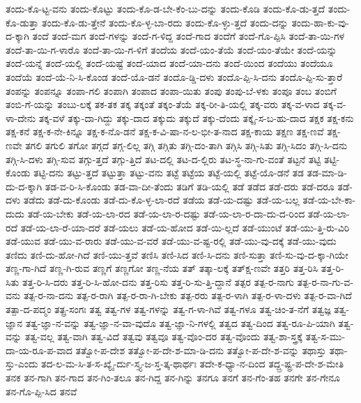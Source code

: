{ತಂದು-ಕೊ-ಟ್ಟ-ವನು
ತಂದು-ಕೊಟ್ಟು
ತಂದು-ಕೊ-ಡ-ಬೇ-ಕೆಂ-ಬು-ದನ್ನು
ತಂದು-ಕೊಡಿ
ತಂದು-ಕೊ-ಡು-ತ್ತದೆ
ತಂದು-ಕೊ-ಡುತ್ತಾ
ತಂದು-ಕೊ-ಡು-ತ್ತೇನೆ
ತಂದು-ಕೊ-ಳ್ಳ-ಬಾ-ರದು
ತಂದು-ಕೊ-ಳ್ಳು-ತ್ತದೆ
ತಂದು-ದನ್ನು
ತಂದು-ಹಾ-ಕು-ವು-ದ-ಕ್ಕಾಗಿ
ತಂದೆ
ತಂದೆ-ಮಗ
ತಂದೆ-ಗಳನ್ನು
ತಂದೆ-ಗ-ಳಿದ್ದ
ತಂದೆ-ಗಾದ
ತಂದೆಗೆ
ತಂದೆ-ಗೊ-ಪ್ಪಿಸಿ
ತಂದೆ-ತಾ-ಯಿ-ಗಳ
ತಂದೆ-ತಾ-ಯಿ-ಗ-ಳಾರೊ
ತಂದೆ-ತಾ-ಯಿ-ಗ-ಳಿಗೆ
ತಂದೆಯ
ತಂದೆ-ಯಂ-ತೆಯೆ
ತಂದೆ-ಯಂ-ತೆಯೇ
ತಂದೆ-ಯನ್ನು
ತಂದೆ-ಯನ್ನೆ
ತಂದೆ-ಯಲ್ಲಿ
ತಂದೆ-ಯಷ್ಟೆ
ತಂದೆ-ಯಾದ
ತಂದೆ-ಯಾ-ದನು
ತಂದೆ-ಯಿಂದ
ತಂದೆಯು
ತಂದೆಯೂ
ತಂದೆಯೆ
ತಂದೆ-ಯೆ-ನಿ-ಸಿ-ಕೊಂಡ
ತಂದೆ-ಯೊ-ಡನೆ
ತಂದೊ-ಡ್ಡಿ-ದಳು
ತಂದೊ-ಪ್ಪಿ-ಸಿ-ದನು
ತಂದೊ-ಪ್ಪಿ-ಸು-ತ್ತಾರೆ
ತಂಪನ್ನು
ತಂಪನ್ನೂ
ತಂಪಾ-ಗಲಿ
ತಂಪಾಗಿ
ತಂಪಾದ
ತಂಪಾ-ಯಿತು
ತಂಪು
ತಂಪು-ಬೆ-ಳಕು
ತಂಪೂ
ತಂಬ
ತಂಬಿಗೆ
ತಂಬಿ-ಗೆ-ಯನ್ನು
ತಂಬು-ಲಕ್ಕೆ
ತಕ-ತಕ
ತಕ್ಕ
ತಕ್ಕಂತೆ
ತಕ್ಕಂ-ತೆಯೆ
ತಕ್ಕ-ರೀ-ತಿ-ಯಲ್ಲಿ
ತಕ್ಕ-ವರು
ತಕ್ಕ-ವ-ಳಾದ
ತಕ್ಕ-ವ-ಳಾ-ದೇನು
ತಕ್ಕ-ವಳೆ
ತಕ್ಕು-ದಾ-ಗಿದ್ದು
ತಕ್ಕು-ದಾದ
ತಕ್ಕುದು
ತಕ್ಕುದೆ
ತಕ್ಕು-ದೆಂದು
ತಕ್ಕೈ-ಸ-ಬ-ಹು-ದಾದ
ತಕ್ಷಕ
ತಕ್ಷ-ಕನು
ತಕ್ಷ-ಕನೆ
ತಕ್ಷ-ಕ-ನೇ-ಕಿನ್ನೂ
ತಕ್ಷ-ಕ-ನೊ-ಡನೆ
ತಕ್ಷ-ಕ-ವಿ-ಷಾ-ನ-ಲ-ಭೀ-ತ-ನಾದ
ತಕ್ಷ-ಕಾಯ
ತಕ್ಷಣ
ತಕ್ಷ-ಣವೆ
ತಕ್ಷ-ಣವೇ
ತಗಲಿ
ತಗುಲಿ
ತಗೋ
ತಗ್ಗದೆ
ತಗ್ಗ-ಲಿಲ್ಲ
ತಗ್ಗಿ
ತಗ್ಗಿತು
ತಗ್ಗಿ-ದಂ-ತಾಗಿ
ತಗ್ಗಿಸಿ
ತಗ್ಗಿ-ಸಿತು
ತಗ್ಗಿ-ಸಿದಂ
ತಗ್ಗಿ-ಸಿ-ದನು
ತಗ್ಗಿ-ಸಿ-ದಳು
ತಗ್ಗಿ-ಸುವ
ತಗ್ಗು-ತ್ತದೆ
ತಗ್ಗು-ತ್ತಿದೆ
ತಟ-ದಲ್ಲಿ
ತಟ-ದ-ಲ್ಲಿರು
ತಟ-ಸ್ಥ-ನಾ-ಗು-ವಂತೆ
ತಟ್ಟನೆ
ತಟ್ಟಿ
ತಟ್ಟಿ-ಕೊಂಡು
ತಟ್ಟಿ-ದನು
ತಟ್ಟು-ತ್ತದೆ
ತಟ್ಟುತ್ತಾ
ತಟ್ಟು-ವನು
ತಟ್ಟೆ
ತಟ್ಟೆಯ
ತಟ್ಟೆ-ಯಲ್ಲಿ
ತಟ್ಟೆ-ಯೊ-ಡನೆ
ತಡ
ತಡ-ಮಾ-ಡಿ-ದು-ದ-ಕ್ಕಾಗಿ
ತಡ-ವ-ರಿ-ಸಿ-ಕೊಂಡು
ತಡ-ವಾ-ದೀ-ತೆಂದು
ತಡಿಗೆ
ತಡಿ-ಯಲ್ಲಿ
ತಡೆ
ತಡೆದ
ತಡೆ-ದರು
ತಡೆ-ದರೂ
ತಡೆ-ದಳು
ತಡೆದು
ತಡೆ-ದು-ಕೊಂಡು
ತಡೆ-ದು-ಕೊ-ಳ್ಳ-ಲಾ-ರದೆ
ತಡೆಯ
ತಡೆ-ಯ-ದಷ್ಟು
ತಡೆ-ಯ-ಬಲ್ಲ
ತಡೆ-ಯ-ಬೇ-ಕಾ-ದುದು
ತಡೆ-ಯ-ಬೇಕು
ತಡೆ-ಯ-ಲಾ-ರದ
ತಡೆ-ಯ-ಲಾ-ರ-ದಷ್ಟು
ತಡೆ-ಯ-ಲಾ-ರ-ದಾ-ದು-ದ-ರಿಂದ
ತಡೆ-ಯ-ಲಾ-ರದೆ
ತಡೆ-ಯ-ಲಾ-ರೆ-ಯಾ-ದರೆ
ತಡೆ-ಯಲು
ತಡೆ-ಯ-ಹೋದ
ತಡೆ-ಯಿ-ಲ್ಲದೆ
ತಡೆ-ಯುಂಟೆ
ತಡೆ-ಯು-ತ್ತಿ-ರು-ವಿರಿ
ತಡೆ-ಯುವ
ತಡೆ-ಯು-ವ-ರಾರು
ತಡೆ-ಯು-ವ-ವರೆ
ತಡೆ-ಯು-ವ-ಷ್ಟ-ರಲ್ಲಿ
ತಡೆ-ಯು-ವು-ದಕ್ಕೆ
ತಡೆ-ಯು-ವುದು
ತಣಿದು
ತಣಿ-ದು-ಹೋ-ಗಿದೆ
ತಣಿ-ಯು-ತ್ತವೆ
ತಣಿಸಿ
ತಣಿ-ಸಿದ
ತಣಿ-ಸಿ-ದನು
ತಣಿ-ಸುತ್ತಾ
ತಣಿ-ಸು-ವು-ದ-ಕ್ಕಾ-ಗಿಯೇ
ತಣ್ಣ-ಗಾ-ಗಿದೆ
ತಣ್ಣ-ಗಿ-ರುವ
ತಣ್ಣಗೆ
ತಣ್ಣಗೋ
ತಣ್ಣ-ನೆಯ
ತತ್
ತತ್ಕಾ-ಲಕ್ಕೆ
ತತ್ಕ್ಷ-ಣವೇ
ತತ್ತರಿ
ತತ್ತ-ರಿಸಿ
ತತ್ತ-ರಿ-ಸಿತು
ತತ್ತ-ರಿ-ಸಿ-ದರು
ತತ್ತ-ರಿ-ಸಿ-ಹೋ-ದನು
ತತ್ತ-ರಿಸು
ತತ್ತ-ರಿ-ಸು-ತ್ತಿ-ದ್ದಾನೆ
ತತ್ಪರ
ತತ್ಪ-ರ-ನಾಗು
ತತ್ಪ-ರ-ನಾ-ಗು-ವ-ವನು
ತತ್ಪ-ರ-ನಾ-ದನು
ತತ್ಪ-ರ-ರಾಗಿ
ತತ್ಪ-ರ-ರಾ-ಗಿ-ಬೇಕು
ತತ್ಪ-ರರು
ತತ್ಪ-ರ-ಳಾಗಿ
ತತ್ಪ-ರ-ಳಾ-ದಳು
ತತ್ಪ-ರ-ವಾ-ಗಿದೆ
ತತ್ಪಾ-ದ-ಪದ್ಮಂ
ತತ್ಪ್ರ-ಸಂಗಃ
ತತ್ವ
ತತ್ವ-ಗಳ
ತತ್ವ-ಗಳನ್ನು
ತತ್ವ-ಗ-ಳಾ-ಗಿವೆ
ತತ್ವ-ಗಳೂ
ತತ್ವ-ಚಿಂ-ತ-ನೆಗೆ
ತತ್ವಜ್ಞ
ತತ್ವ-ಜ್ಞಾನ
ತತ್ವ-ಜ್ಞಾ-ನ-ವನ್ನು
ತತ್ವ-ಜ್ಞಾ-ನ-ವಾ-ವುದೊ
ತತ್ವ-ಜ್ಞಾ-ನಿ-ಗಳಲ್ಲಿ
ತತ್ವದ
ತತ್ವ-ದಿಂದ
ತತ್ವ-ರೂ-ಪಿ-ಯಾಗಿ
ತತ್ವ-ವನ್ನು
ತತ್ವ-ವಲ್ಲ
ತತ್ವ-ವಾಗಿ
ತತ್ವ-ವಿದೆ
ತತ್ವವು
ತತ್ವವೂ
ತತ್ವ-ವೊಂ-ದರ
ತತ್ವ-ವೊಂದು
ತತ್ವ-ಶಾ-ಸ್ತ್ರಕ್ಕೆ
ತತ್ವ-ಸ-ಮು-ದಾ-ಯ-ರೂ-ಪ-ವಾದ
ತತ್ವೋ-ಪ-ದೇಶ
ತತ್ವೋ-ಪ-ದೇ-ಶ-ಮಾ-ಡಿ-ದನು
ತತ್ವೋ-ಪ-ದೇ-ಶ-ವನ್ನು
ತಥಾಸ್ತು
ತಥಾ-ಸ್ತು-ಎಂದು
ತದ-ಲ-ಮ-ಸಿ-ತ-ಸ-ಖ್ಯೈ-ರ್ದು-ಸ್ತ್ಯ-ಜ-ಸ್ತ-ತ್ಕ-ಥಾರ್ಥಃ
ತದೇ-ಕ-ಧ್ಯಾ-ನ-ದಿಂದ
ತದ್ದ್ರ-ಷ್ಟ್ರ-ಪ-ದೇ-ಶ-ಮೇತಿ
ತನಕ
ತನ-ಗಾಗಿ
ತನ-ಗಾದ
ತನ-ಗಿಂ-ತಲೂ
ತನ-ಗಿದ್ದ
ತನ-ಗಿನ್ನು
ತನಗೂ
ತನಗೆ
ತನ-ಗೆಂ-ತಹ
ತನಗೇ
ತನ-ಗೇನೂ
ತನ-ಗೊ-ಪ್ಪಿ-ಸಿದ
ತನವೆ
}
